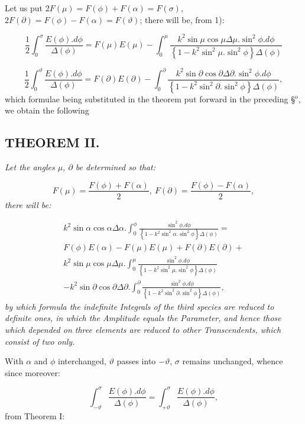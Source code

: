 \documentclass{article}
\begin{document}
Let us put $2F(\mu)=F(\phi)+F(\alpha)=F(\sigma)$, $2F(\partial)=F(\phi)-F(\alpha)=F(\vartheta)$; there will be, from 1):

\[
\frac{1}{2}\int_{0}^{\sigma}\frac{E(\phi).d\phi}{\Delta(\phi)}=F(\mu)E(\mu)-\int_{0}^{\mu}\frac{k^{2}\sin\mu\cos\mu\Delta\mu.\sin^{2}\phi.d\phi}{\left\{1-k^{2}\sin^{2}\mu.\sin^{2}\phi\right\}\Delta(\phi)}
\]

\[
\frac{1}{2}\int_{0}^{\vartheta}\frac{E(\phi).d\phi}{\Delta(\phi)}=F(\partial)E(\partial)-\int_{0}^{\partial}\frac{k^{2}\sin\partial\cos\partial\Delta\partial.\sin^{2}\phi.d\phi}{\left\{1-k^{2}\sin^{2}\partial.\sin^{2}\phi\right\}\Delta(\phi)},
\]
which formulae being substituted in the theorem put forward in the preceding §$^{\mathrm{o}}$, we obtain the following

\subsection*{THEOREM II.}

\emph{Let the angles $\mu$, $\partial$ be determined so that:}

\[
F(\mu)=\frac{F(\phi)+F(\alpha)}{2},\ F(\partial)=\frac{F(\phi)-F(\alpha)}{2},
\]
\emph{there will be:}

\[
\begin{gathered}
k^{2}\sin\alpha\cos\alpha\Delta\alpha.\int_{0}^{\phi}\frac{\sin^{2}\phi.d\phi}{\left\{1-k^{2}\sin^{2}\alpha.\sin^{2}\phi\right\}\Delta(\phi)}=\\[1.5ex]
F(\phi)E(\alpha)-F(\mu)E(\mu)+F(\partial)E(\partial)+\\[1.5ex]
k^{2}\sin\mu\cos\mu\Delta\mu.\int_{0}^{\mu}\frac{\sin^{2}\phi.d\phi}{\left\{1-k^{2}\sin^{2}\mu.\sin^{2}\phi\right\}\Delta(\phi)}\\[1.5ex]
-k^{2}\sin\partial\cos\partial\Delta\partial.\int_{0}^{\partial}\frac{\sin^{2}\phi.d\phi}{\left\{1-k^{2}\sin^{2}\partial.\sin^{2}\phi\right\}\Delta(\phi)},
\end{gathered}
\]
\emph{by which formula the indefinite Integrals of the third species are reduced to definite ones, in which the Amplitude equals the Parameter, and hence those which depended on three elements are reduced to other Transcendents, which consist of two only.}

With $\alpha$ and $\phi$ interchanged, $\vartheta$ passes into $-\vartheta$, $\sigma$ remains unchanged, whence since moreover:

\[
\int_{-\vartheta}^{\sigma}\frac{E(\phi).d\phi}{\Delta(\phi)}=\int_{+\vartheta}^{\sigma}\frac{E(\phi).d\phi}{\Delta(\phi)},
\]
from Theorem I:
\end{document}
